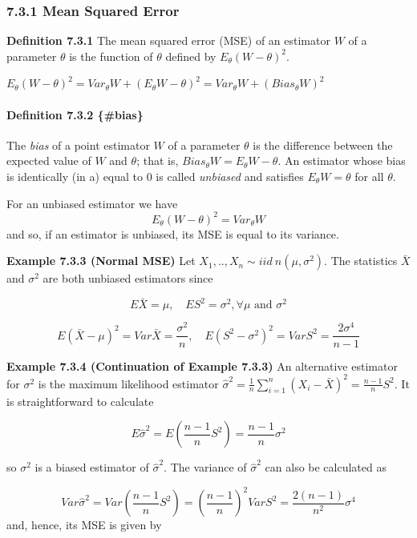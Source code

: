 \documentclass[6pt,Portrait]{article}
\let\oldparagraph\paragraph
\renewcommand{\paragraph}[1]{\oldparagraph{#1}\mbox{}}
\begin{document}
\hypertarget{MSE}{%
\subsubsection{7.3.1 Mean Squared Error}\label{MSE}}

\textbf{Definition 7.3.1} The mean squared error (MSE) of an estimator
\(W\) of a parameter \(\theta\) is the function of \(\theta\) defined by
\(E_{\theta}(W-\theta)^2\).

\(E_{\theta}(W-\theta)^2=Var_{\theta}W+(E_{\theta}W-\theta)^2=Var_{\theta}W+(Bias_{\theta}W)^2\)

\hypertarget{unbias}{%
\paragraph{\texorpdfstring{\textbf{Definition 7.3.2}
\{\#bias\}}{Definition 7.3.2 \{\#bias\}}}\label{unbias}}

The \emph{bias} of a point estimator \(W\) of a parameter \(\theta\) is
the difference between the expected value of \(W\) and \(\theta\); that
is, \(Bias_{\theta}W=E_{\theta}W-\theta\). An estimator whose bias is
identically (in a) equal to 0 is called \emph{unbiased} and satisfies
\(E_{\theta}W=\theta\) for all \(\theta\).

For an unbiased estimator we have
\[E_{\theta}(W-\theta)^2=Var_{\theta}W\] and so, if an estimator is
unbiased, its MSE is equal to its variance.

\textbf{Example 7.3.3 (Normal MSE)} Let
\(X_1,..,X_n\sim iid\ n(\mu,\sigma^2)\). The statistics \(\bar X\) and
\(\sigma^2\) are both unbiased estimators since

\[E\bar X=\mu,\quad ES^2=\sigma^2, \forall\mu \text{ and } \sigma^2\]

\[E(\bar X-\mu)^2=Var\bar X=\frac{\sigma^2}{n},\quad E(S^2-\sigma^2)^2=VarS^2=\frac{2\sigma^4}{n-1}\]

\textbf{Example 7.3.4 (Continuation of Example 7.3.3)} An alternative
estimator for \(\sigma^2\) is the maximum likelihood estimator
\(\hat\sigma^2=\frac1n\sum_{i=1}^n(X_i-\bar X)^2=\frac{n-1}nS^2\). It is
straightforward to calculate

\[E\hat\sigma^2=E\left(\frac{n-1}nS^2\right)=\frac{n-1}n\sigma^2\]

so \(\sigma^2\) is a biased estimator of \(\hat\sigma^2\). The variance
of \(\hat\sigma^2\) can also be calculated as

\[Var\hat\sigma^2=Var\left(\frac{n-1}nS^2\right)=\left(\frac{n-1}n\right)^2VarS^2=\frac{2(n-1)}{n^2}\sigma^4\]
and, hence, its MSE is given by
\end{document}
